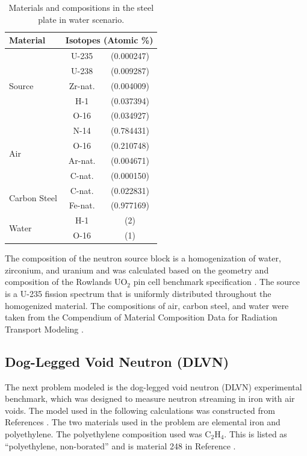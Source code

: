 \documentclass{article} %
\begin{document}
\begin{table}[!htb]
\centering
\caption{Materials and compositions in the steel plate in water scenario.}
\label{steel-mat}
\begin{tabular}{l|cc}
\textbf{Material} & \multicolumn{2}{c}{\textbf{Isotopes (Atomic \%)}} \\ \hline
\multirow{5}{*}{Source}   & U-235   & (0.000247) \\
                          & U-238   & (0.009287) \\
                          & Zr-nat. & (0.004009) \\
                          & H-1     & (0.037394) \\
                          & O-16    & (0.034927) \\ \hline
\multirow{4}{*}{Air}      & N-14    & (0.784431) \\
                          & O-16    & (0.210748) \\
                          & Ar-nat. & (0.004671) \\
                          & C-nat.  & (0.000150) \\ \hline
\multirow{2}{*}{Carbon Steel} & C-nat.  & (0.022831) \\
                              & Fe-nat. & (0.977169) \\ \hline
\multirow{2}{*}{Water}        & H-1     & (2)        \\
                              & O-16    & (1)        \\
\end{tabular}
\end{table}

The composition of the neutron source block is a homogenization of water,
zirconium, and uranium and was calculated based on the geometry and composition
of the Rowlands UO$_2$ pin cell benchmark specification \cite{pincell}. The
source is a U-235 fission 
spectrum that is uniformly distributed throughout the homogenized material. The
compositions of air, carbon steel, and water were taken from the Compendium of 
Material Composition Data for Radiation Transport Modeling \cite{pnnl}.

\subsection{Dog-Legged Void Neutron (DLVN)}

The next problem modeled is the dog-legged void neutron (DLVN) experimental 
benchmark, which was designed to measure neutron streaming in iron with air
voids. The model used in the following calculations was constructed from
References \cite{sw-dlvn,j-dlvn,dlvn1991}. The two materials used in the
problem are elemental iron and polyethylene. The polyethylene composition used
was C$_2$H$_4$. This is listed as ``polyethylene, non-borated'' and is material
248 in Reference \cite{pnnl}. 
\end{document}
